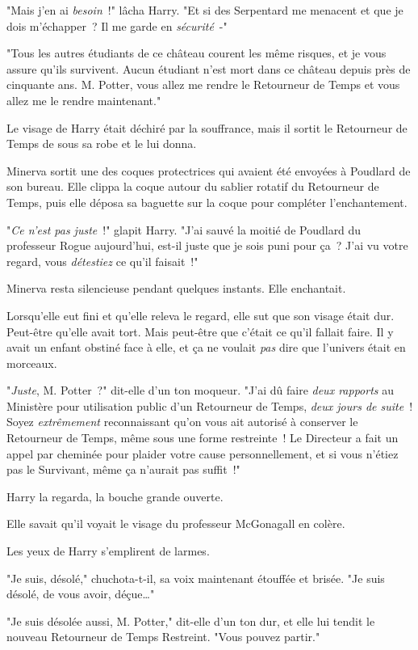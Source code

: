 "Mais j'en ai \emph{besoin}~!" lâcha Harry. "Et si des Serpentard me menacent et que je dois m'échapper~? Il me garde en \emph{sécurité}~-"

"Tous les autres étudiants de ce château courent les même risques, et je vous assure qu'ils survivent. Aucun étudiant n'est mort dans ce château depuis près de cinquante ans. M. Potter, vous allez me rendre le Retourneur de Temps et vous allez me le rendre maintenant."

Le visage de Harry était déchiré par la souffrance, mais il sortit le Retourneur de Temps de sous sa robe et le lui donna.

Minerva sortit une des coques protectrices qui avaient été envoyées à Poudlard de son bureau. Elle clippa la coque autour du sablier rotatif du Retourneur de Temps, puis elle déposa sa baguette sur la coque pour compléter l'enchantement.

"\emph{Ce n'est pas juste}~!" glapit Harry. "J'ai sauvé la moitié de Poudlard du professeur Rogue aujourd'hui, est-il juste que je sois puni pour ça~? J'ai vu votre regard, vous \emph{détestiez} ce qu'il faisait~!"

Minerva resta silencieuse pendant quelques instants. Elle enchantait.

Lorsqu'elle eut fini et qu'elle releva le regard, elle sut que son visage était dur. Peut-être qu'elle avait tort. Mais peut-être que c'était ce qu'il fallait faire. Il y avait un enfant obstiné face à elle, et ça ne voulait \emph{pas} dire que l'univers était en morceaux.

"\emph{Juste}, M. Potter~?" dit-elle d'un ton moqueur. "J'ai dû faire \emph{deux rapports} au Ministère pour utilisation public d'un Retourneur de Temps, \emph{deux jours de suite}~! Soyez \emph{extrêmement} reconnaissant qu'on vous ait autorisé à conserver le Retourneur de Temps, même sous une forme restreinte~! Le Directeur a fait un appel par cheminée pour plaider votre cause personnellement, et si vous n'étiez pas le Survivant, même ça n'aurait pas suffit~!"

Harry la regarda, la bouche grande ouverte.

Elle savait qu'il voyait le visage du professeur McGonagall en colère.

Les yeux de Harry s'emplirent de larmes.

"Je suis, désolé," chuchota-t-il, sa voix maintenant étouffée et brisée. "Je suis désolé, de vous avoir, déçue…"

"Je suis désolée aussi, M. Potter," dit-elle d'un ton dur, et elle lui tendit le nouveau Retourneur de Temps Restreint. "Vous pouvez partir."

